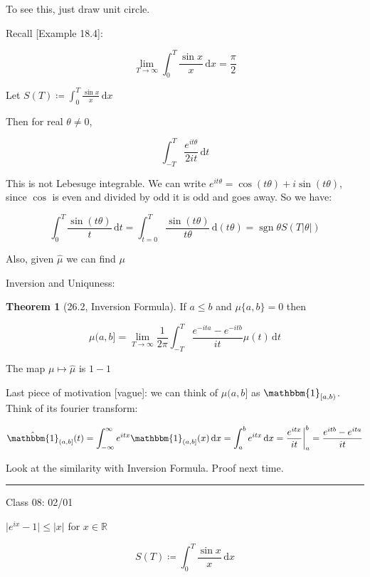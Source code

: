 \documentclass{article}
\theoremstyle{definition}
\newtheorem{theorem}{Theorem}
\begin{document}
To see this, just draw unit circle.

Recall [Example 18.4]:

\[
    \lim_{T \to \infty} \int_{0}^{T} \frac{\sin x}{x} \,\mathrm{d}x = \frac{\pi}{2}
\]

Let \(S(T)\coloneqq \int_{0}^{T} \frac{\sin x}{x} \,\mathrm{d}x \) 

Then for real \(\theta \neq 0\),

\[
    \int_{-T}^{T} \frac{e^{it \theta } }{2it} \,\mathrm{d}t 
\]

This is not Lebesuge integrable. We can write \(e^{it \theta }=\cos (t \theta )+ i \sin (t \theta) \), since \(\cos \) is even and divided by odd it is odd and goes away. So we have:

\[
    \int_{0}^{T} \frac{\sin(t \theta)}{t} \,\mathrm{d}t = \int_{t=0}^{T} \frac{\sin(t \theta)}{t \theta} \,\mathrm{d}(t \theta) = \operatorname{sgn}\theta S(T \vert \theta \vert )
\]

Also, given \(\hat{\mu} \) we can find \(\mu\) 

Inversion and Uniquness:

\begin{theorem}[26.2, Inversion Formula]

    If \(a \leq b\) and \(\mu \{ a,b \} = 0\) then
    
    \[
        \mu (a,b] = \lim_{T \to \infty} \frac{1}{2\pi} \int_{-T}^{T} \frac{e^{-ita}-e^{-itb}}{it} \hat{\mu}(t) \,\mathrm{d}t
    \]  

    The map \(\mu \mapsto \hat{\mu}\) is \(1-1\) 

\end{theorem}

Last piece of motivation [vague]: we can think of \(\mu (a,b]\) as \(\mathbbm{1}_{[a,b)} \). Think of its fourier transform:

\[
    \hat{\mathbbm{1}}_{(a,b]}(t)=\int_{-\infty}^{\infty} e^{itx} \mathbbm{1}_{(a,b]}(x) \,\mathrm{d}x = \int_{a}^{b} e^{itx} \,\mathrm{d}x = \frac{e^{itx}}{it}\bigg|^b_a = \frac{e^{itb} - e^{ita}}{it} 
\]

Look at the similarity with Inversion Formula. Proof next time.

\hfil
\hrule

Class 08: 02/01

\(\vert e^{ix} - 1 \vert \leq \vert x \vert \) for \(x\in \mathbb{R} \)

\[
    S(T)\coloneqq \int_{0}^{T} \frac{\sin x}{x} \,\mathrm{d}x 
\]
\end{document}
